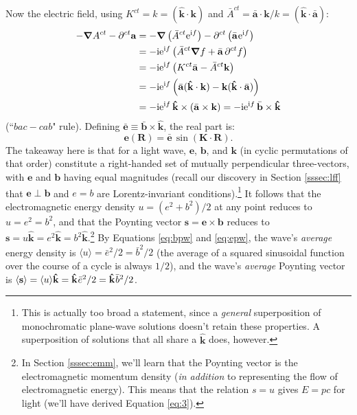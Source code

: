 \documentclass[12pt]{article}
\renewcommand{\vv}[1]{\mathbf{#1}}
\newcommand{\del}{\boldsymbol{\nabla}}
\begin{document}
Now the electric field, using $K^{ct} = k = (\vv{\hat{k}} \cdot \vv k)$ and $\bar{A}^{ct} = \bar{\vv a} \cdot \vv k / k = (\vv{\hat{k}} \cdot \bar{\vv a} )$:
\begin{equation*}
\begin{aligned}
- \del A^{ct} - \partial^{ct} \vv a &= - \del \left( \bar{A}^{ct} \mathrm{e}^{\mathrm{i} f} \right) - \partial^{ct} \left( \bar{\vv a} \mkern1mu \mathrm{e}^{\mathrm{i} f} \right) \\
&= - \mathrm{i} \mathrm{e}^{\mathrm{i} f} \left( \bar{A}^{ct} \del f + \bar{\vv a} \, \partial^{ct} f \right) \\
&= - \mathrm{i} \mathrm{e}^{\mathrm{i} f} \left( K^{ct} \bar{\vv a} - \bar{A}^{ct} \vv k \right) \\[1pt]
&= - \mathrm{i} \mathrm{e}^{\mathrm{i} f} \left( \bar{\vv a} (\vv{\hat{k}} \cdot \vv k )  - \vv k (\vv{\hat{k}} \cdot \bar{\vv a} ) \right) \\[1pt]
&= - \mathrm{i} \mathrm{e}^{\mathrm{i} f} \, \vv{\hat{k}} \times (\bar{\vv a} \times \vv k) = - \mathrm{i} \mathrm{e}^{\mathrm{i} f} \, \bar{\vv b} \times \vv{\hat{k}}
\end{aligned}
\end{equation*}
(``$bac - cab$" rule). Defining $\bar{\vv e} \equiv \bar{\vv b} \times \vv{\hat{k}}$, the real part is:
\begin{equation}\label{eq:epw}
\vv e (\vv R) = \bar{\vv e} \, \sin \left( \vv K \cdot \vv R \right) .
\end{equation}
The takeaway here is that for a light wave, $\vv e$, $\vv b$, and $\vv k$ (in cyclic permutations of that order) constitute a right-handed set of mutually perpendicular three-vectors, with $\vv e$ and $\vv b$ having equal magnitudes (recall our discovery in Section \ref{sssec:lff} that $\vv e \perp \vv b$ and $e = b$ are Lorentz-invariant conditions).\footnote{This is actually too broad a statement, since a \emph{general} superposition of monochromatic plane-wave solutions doesn't retain these properties. A superposition of solutions that all share a $\vv{\hat{k}}$ does, however.} It follows that the electromagnetic energy density $u = (e^2 + b^2) / 2$ at any point reduces to $u = e^2 = b^2$, and that the Poynting vector $\vv s = \vv e \times \vv b$ reduces to ${\vv s = u \vv{\hat{k}} = e^2 \vv{\hat{k}} = b^2 \vv{\hat{k}}}$.\footnote{\label{fn:epc}In Section \ref{sssec:emm}, we'll learn that the Poynting vector is the electromagnetic momentum density (\emph{in addition} to representing the flow of electromagnetic energy). This means that the relation $s = u$ gives $E = pc$ for light (we'll have derived Equation \ref{eq:3}).} By Equations \ref{eq:bpw} and \ref{eq:epw}, the wave's \emph{average} energy density is $\langle u \rangle = \bar{e}^2 / 2 = \bar{b}^2 / 2$ (the average of a squared sinusoidal function over the course of a cycle is always $1/2$), and the wave's \emph{average} Poynting vector is $\langle \vv s \rangle = \langle u \rangle \vv{\hat{k}} = \vv{\hat{k}} \mkern1mu \bar{e}^2 / 2 = \vv{\hat{k}} \mkern1mu \bar{b}^2 / 2$.
\end{document}
